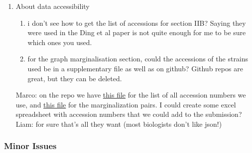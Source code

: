 \documentclass[aps,rmp,onecolumn]{revtex4-1}
\newcommand{\Marco}[1]{{\color{gray}Marco: #1}}
\newcommand{\Liam}[1]{{\color{teal}Liam: #1}}
\begin{document}
\begin{enumerate}
      \item About data accessibility
            \begin{enumerate}
                  \item i don't see how to get the list of accessions for section IIB? Saying they were used in the Ding et al paper is not quite enough for me to be sure which ones you used.
                  \item for the graph marginalisation section, could the accessions of the strains used be in a supplementary file as well as on github? Github repos are great, but they can be deleted.
            \end{enumerate}
            \Marco{on the repo we have \href{https://github.com/neherlab/pangraph/blob/master/script/config/accnums.json}{this file} for the list of all accession numbers we use, and \href{https://github.com/neherlab/pangraph/blob/master/script/config/projection_strains.json}{this file} for the marginalization pairs. I could create some excel spreadsheet with accession numbers that we could add to the submission?}\\
            \Liam{for sure that's all they want (most biologists don't like json!)}
\end{enumerate}

\subsubsection*{Minor Issues}
\end{document}
